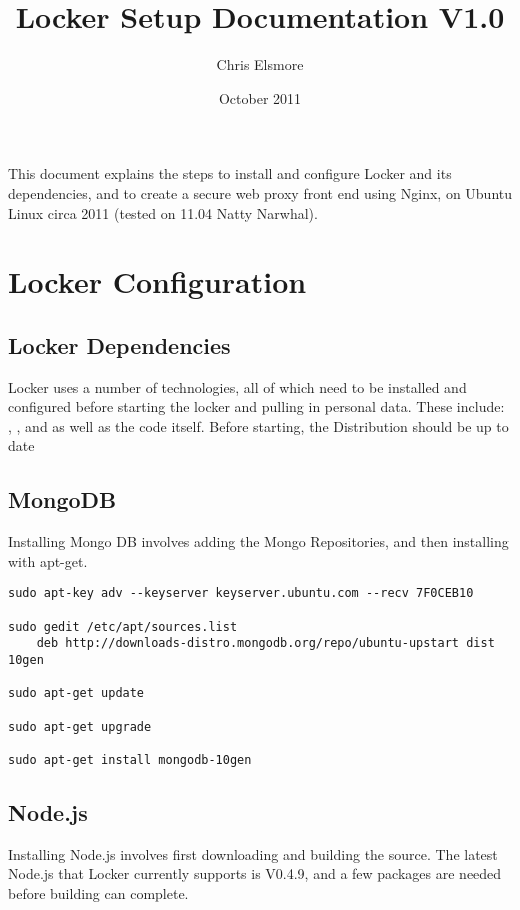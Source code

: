\documentclass[A4paper,11pt]{article}
\title{Locker Setup Documentation V1.0}
\author{Chris Elsmore}
\date{October 2011}
\begin{document}
\maketitle

This document explains the steps to install and configure Locker and its dependencies, and to create a secure web proxy front end using Nginx, on Ubuntu Linux circa 2011 (tested on 11.04 Natty Narwhal).

\section{Locker Configuration}
\label{sec:LockerConfiguration}


\subsection{Locker Dependencies}
\label{subsec:LockerDepenedcies}

Locker uses a number of technologies, all of which need to be installed and configured before starting the locker and pulling in personal data. These include: , ,  and  as well as the  code itself. Before starting, the Distribution should be up to date

\subsection{MongoDB}
\label{subsec:MongoDB}

Installing Mongo DB involves adding the Mongo Repositories, and then installing with apt-get.

\begin{lstlisting}
sudo apt-key adv --keyserver keyserver.ubuntu.com --recv 7F0CEB10

sudo gedit /etc/apt/sources.list
    deb http://downloads-distro.mongodb.org/repo/ubuntu-upstart dist 10gen

sudo apt-get update

sudo apt-get upgrade

sudo apt-get install mongodb-10gen
\end{lstlisting}


\subsection{Node.js}
\label{subsec:Node.js}

Installing Node.js involves first downloading and building the source. The latest Node.js that Locker currently supports is V0.4.9, and a few packages are needed before building can complete.
\end{document}
